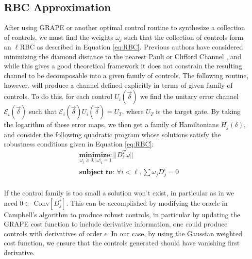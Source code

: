 \documentclass[aps,nofootinbib,pra,notitlepage,twocolumn]{revtex4-1}
\begin{document}
\subsection{RBC Approximation}
After using GRAPE or another optimal control routine to synthesize a collection of controls, we must find the weights $\omega_j$ such that the collection of controls form an $\ell$RBC as described in Equation \ref{eq:RBC}. Previous authors have considered minimizing the diamond distance to the nearest Pauli or Clifford Channel \cite{Magesan2013}, and while this gives a good theoretical framework it does not constrain the resulting channel to be decomposable into a given family of controls. The following routine, however, will produce a channel defined explicitly in terms of given family of controls. To do this, for each control $U_i(\vec{\delta})$ we find the unitary error channel $\mathcal{E}_i(\vec{\delta})$ such that $\mathcal{E}_i(\vec{\delta})U_i(\vec{\delta})=U_T$, where $U_T$ is the target gate. By taking the logarithm of these error maps, we then get a family of Hamiltonians $\tilde{H}_j(\delta)$, and consider the following quadratic program whose solutions satisfy the robustness conditions given in Equation \ref{eq:RBC}:
\begin{equation}\label{eq:minimization}
  \begin{split}
    &\underset{\omega_j\geq0, |\omega|_1=1}{\textbf{minimize}: } ||D_{\ell}^T\omega||\\
    &\textbf{subject to: } \forall i<\ell, \sum \omega_jD_j^i=0\\
  \end{split}
\end{equation}

If the control family is too small a solution won't exist, in particular as in \cite{Campbell2017} we need  $0\in $ Conv$[D_j^i]$.  This can be accomplished by modifying the oracle in Campbell's algorithm to produce robust controls, in particular by updating the GRAPE cost function to include derivative information, one could produce controls with derivatives of order $\epsilon$. In our case, by using the Gaussian weighted cost function, we ensure that the controls generated should have vanishing first derivative.
\end{document}
